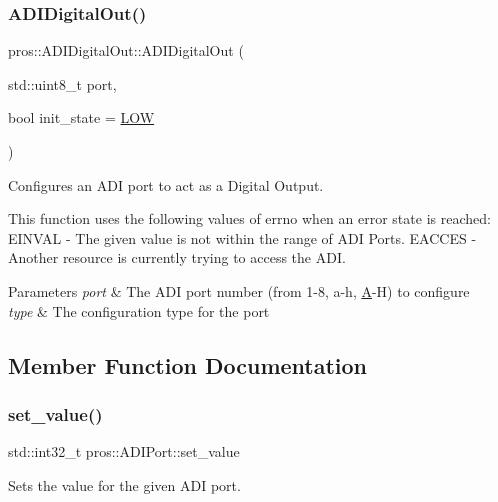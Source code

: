 \subsubsection{\texorpdfstring{ADIDigitalOut()}{ADIDigitalOut()}}
{\footnotesize\ttfamily pros\+::\+A\+D\+I\+Digital\+Out\+::\+A\+D\+I\+Digital\+Out (\begin{DoxyParamCaption}\item[{std\+::uint8\+\_\+t}]{port,  }\item[{bool}]{init\+\_\+state = {\ttfamily \mbox{\hyperlink{adi_8h_ab811d8c6ff3a505312d3276590444289}{L\+OW}}} }\end{DoxyParamCaption})}



Configures an A\+DI port to act as a Digital Output. 

This function uses the following values of errno when an error state is reached\+: E\+I\+N\+V\+AL -\/ The given value is not within the range of A\+DI Ports. E\+A\+C\+C\+ES -\/ Another resource is currently trying to access the A\+DI.


\begin{DoxyParams}{Parameters}
{\em port} & The A\+DI port number (from 1-\/8, \textquotesingle{}a\textquotesingle{}-\/\textquotesingle{}h\textquotesingle{}, \textquotesingle{}\mbox{\hyperlink{structA}{A}}\textquotesingle{}-\/\textquotesingle{}H\textquotesingle{}) to configure \\
\hline
{\em type} & The configuration type for the port \\
\hline
\end{DoxyParams}


\subsection{Member Function Documentation}
\mbox{\label{classpros_1_1ADIDigitalOut_ae6711117fbceb3bb6e3602c4ef63aff1}} 
\subsubsection{\texorpdfstring{set\_value()}{set\_value()}}
{\footnotesize\ttfamily std\+::int32\+\_\+t pros\+::\+A\+D\+I\+Port\+::set\+\_\+value}



Sets the value for the given A\+DI port. 

